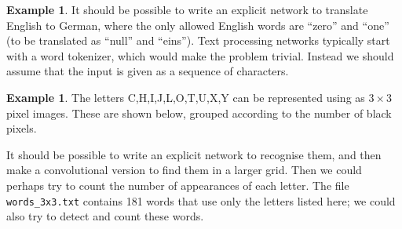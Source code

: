 \documentclass{amsart}
\newcommand{\fr}[4]{\fill (#1,#2) rectangle (#3,#4);}
\newcommand{\gr}[1]{\foreach \i in {0,1,...,#1} {\draw(\i,0) -- (\i,#1); \draw(0,\i) -- (#1,\i);}}
\renewcommand{\:}{\colon}
\theoremstyle{definition}
\newtheorem{example}[theorem]{Example}
\begin{document}
\begin{example}\label{eg-binary-words}
 It should be possible to write an explicit network to translate
 English to German, where the only allowed English words are ``zero''
 and ``one'' (to be translated as ``null'' and ``eins'').  Text
 processing networks typically start with a word tokenizer, which
 would make the problem trivial.  Instead we should assume that the
 input is given as a sequence of characters.
\end{example}

\begin{example}\label{eg-letters}
 The letters C,H,I,J,L,O,T,U,X,Y can be represented using as $3\times 3$
 pixel images.  These are shown below, grouped according to the number of 
 black pixels. 
 \begin{center}
 \end{center}
 It should be possible to write an explicit network to
 recognise them, and then make a convolutional version to find them in
 a larger grid.  Then we could perhaps try to count the number of
 appearances of each letter.  The file \verb+words_3x3.txt+ contains 
 181 words that use only the letters listed here; we could also try to
 detect and count these words.
\end{example}
\end{document}
